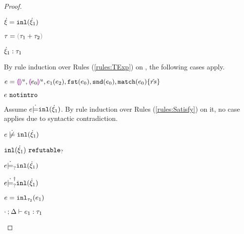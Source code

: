 \begin{proof}
\begin{byCases}
\begin{byCases}
        
    \end{byCases}
\item[\text{(\ref{rule:CTInl})}]
    \begin{pfsteps*}
    \item $\dot{\xi}=\mathtt{inl}(\dot{\xi}_1)$ 
    \item $\tau=\tsum{\tau_1}{\tau_2}$ 
    \item $\dot{\xi}_1 : \tau_1$  
    \end{pfsteps*}
    By rule induction over Rules (\ref{rules:TExp}) on , the following cases apply.
    \begin{byCases}
    \item[\text{(\ref{rule:TEHole}),(\ref{rule:THole}),(\ref{rule:TAp}),(\ref{rule:TFst}),(\ref{rule:TSnd}),(\ref{rule:TMatchZPre}),(\ref{rule:TMatchNZPre})}]
        \begin{pfsteps*}
        \item $e=\textcolor{violet}{\llparenthesis}\textcolor{violet}{\rrparenthesis}^{u},\textcolor{violet}{\llparenthesis} e_0\textcolor{violet}{\rrparenthesis}^{u},e_1(e_2),\mathtt{fst}(e_0),\mathtt{snd}(e_0),\mathtt{match}(e_0) \{\hat{rs}\}$ 
        \item $e ~\mathtt{notintro}$  
        \end{pfsteps*}
        Assume $e \dot{\models} \mathtt{inl}(\dot{\xi}_1)$. By rule induction over Rules (\ref{rules:Satisfy}) on it, no case applies due to syntactic contradiction.
        \begin{pfsteps*}
        \item $\cnotsatisfy{e}{\cinl{\hxi_1}}$  
        \item $\mathtt{inl}(\dot{\xi}_1) ~\mathtt{refutable}_?$  
        \item $e \dot{\models}_{?} \mathtt{inl}(\dot{\xi}_1)$  
        \item $e \dot{\models}_{?}^{\dag} \mathtt{inl}(\dot{\xi}_1)$ 
        \end{pfsteps*}
    \item[\text{(\ref{rule:TInl})}]
        \begin{pfsteps*}
        \item $e=\mathtt{inl}_{\tau_2}({e_1})$ 
        \item $\cdot \mathbin{;} \Delta \vdash e_1 : \tau_1$  

\end{pfsteps*}
\end{byCases}
\end{byCases}
\end{proof}
